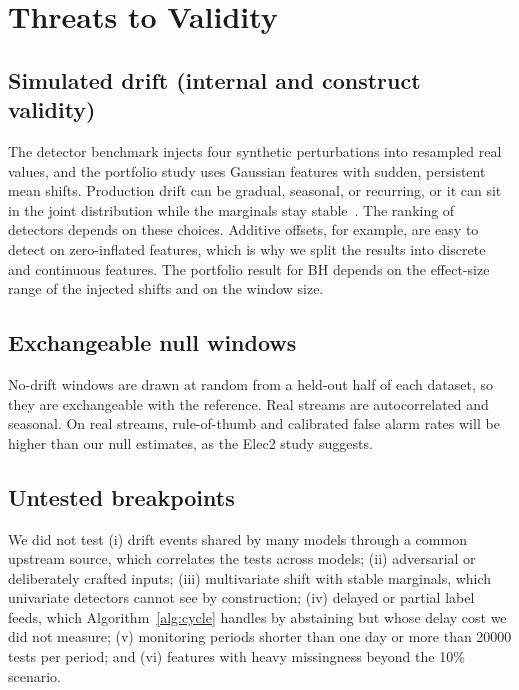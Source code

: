 \documentclass[journal]{IEEEtran}
\begin{document}
\section{Threats to Validity}
\label{sec:threats}

\subsection{Simulated drift (internal and construct validity)}

The detector benchmark injects four synthetic perturbations into resampled real values, and the portfolio study uses Gaussian features with sudden, persistent mean shifts. Production drift can be gradual, seasonal, or recurring, or it can sit in the joint distribution while the marginals stay stable~\cite{webb2016}. The ranking of detectors depends on these choices. Additive offsets, for example, are easy to detect on zero-inflated features, which is why we split the results into discrete and continuous features. The portfolio result for BH depends on the effect-size range of the injected shifts and on the window size.

\subsection{Exchangeable null windows}

No-drift windows are drawn at random from a held-out half of each dataset, so they are exchangeable with the reference. Real streams are autocorrelated and seasonal. On real streams, rule-of-thumb and calibrated false alarm rates will be higher than our null estimates, as the Elec2 study suggests.

\subsection{Untested breakpoints}

We did not test (i) drift events shared by many models through a common upstream source, which correlates the tests across models; (ii) adversarial or deliberately crafted inputs; (iii) multivariate shift with stable marginals, which univariate detectors cannot see by construction; (iv) delayed or partial label feeds, which Algorithm~\ref{alg:cycle} handles by abstaining but whose delay cost we did not measure; (v) monitoring periods shorter than one day or more than 20000 tests per period; and (vi) features with heavy missingness beyond the 10\% scenario.
\end{document}
